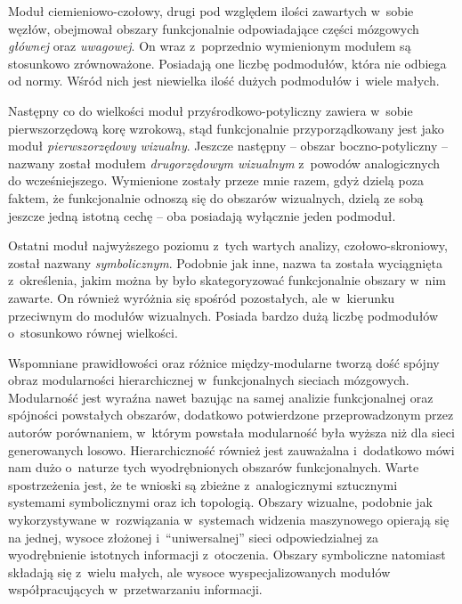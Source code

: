 Moduł ciemieniowo-czołowy, drugi pod względem ilości zawartych w~sobie węzłów, obejmował obszary funkcjonalnie odpowiadające części mózgowych \emph{głównej} oraz \emph{uwagowej}.
On wraz z~poprzednio wymienionym modułem są stosunkowo zrównoważone.
Posiadają one liczbę podmodułów, która nie odbiega od normy.
Wśród nich jest niewielka ilość dużych podmodułów i~wiele małych.

Następny co do wielkości moduł przyśrodkowo-potyliczny zawiera w~sobie pierwszorzędową korę wzrokową, stąd funkcjonalnie przyporządkowany jest jako moduł \emph{pierwszorzędowy wizualny}.
Jeszcze następny -- obszar boczno-potyliczny -- nazwany został modułem \emph{drugorzędowym wizualnym} z~powodów analogicznych do wcześniejszego.
Wymienione zostały przeze mnie razem, gdyż dzielą poza faktem, że funkcjonalnie odnoszą się do obszarów wizualnych, dzielą ze sobą jeszcze jedną istotną cechę -- oba posiadają wyłącznie jeden podmoduł.

Ostatni moduł najwyższego poziomu z~tych wartych analizy, czołowo-skroniowy, został nazwany \emph{symbolicznym}.
Podobnie jak inne, nazwa ta została wyciągnięta z~określenia, jakim można by było skategoryzować funkcjonalnie obszary w~nim zawarte.
On również wyróżnia się spośród pozostałych, ale w~kierunku przeciwnym do modułów wizualnych.
Posiada bardzo dużą liczbę podmodułów o~stosunkowo równej wielkości.

Wspomniane prawidłowości oraz różnice między-modularne tworzą dość spójny obraz modularności hierarchicznej w~funkcjonalnych sieciach mózgowych.
Modularność jest wyraźna nawet bazując na samej analizie funkcjonalnej oraz spójności powstałych obszarów, dodatkowo potwierdzone przeprowadzonym przez autorów porównaniem, w~którym powstała modularność była wyższa niż dla sieci generowanych losowo.
Hierarchiczność również jest zauważalna i~dodatkowo mówi nam dużo o~naturze tych wyodrębnionych obszarów funkcjonalnych.
Warte spostrzeżenia jest, że te wnioski są zbieżne z~analogicznymi sztucznymi systemami symbolicznymi oraz ich topologią.
Obszary wizualne, podobnie jak wykorzystywane w~rozwiązania w~systemach widzenia maszynowego opierają się na jednej, wysoce złożonej i~``uniwersalnej'' sieci odpowiedzialnej za wyodrębnienie istotnych informacji z~otoczenia.
Obszary symboliczne natomiast składają się z~wielu małych, ale wysoce wyspecjalizowanych modułów współpracujących w~przetwarzaniu informacji.
